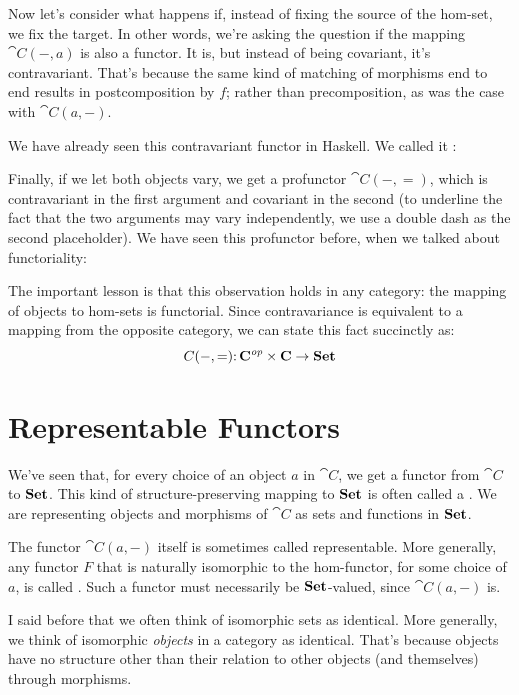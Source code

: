 
Now let's consider what happens if, instead of fixing the source of the
hom-set, we fix the target. In other words, we're asking the question if
the mapping $\cat{C}(-, a)$ is also a functor. It is, but instead of being covariant, it's
contravariant. That's because the same kind of matching of morphisms end
to end results in postcomposition by $f$; rather than
precomposition, as was the case with $\cat{C}(a, -)$.

We have already seen this contravariant functor in Haskell. We called it
:


Finally, if we let both objects vary, we get a profunctor
$\cat{C}(-, =)$, which is contravariant in the first argument and
covariant in the second (to underline the fact that the two arguments
may vary independently, we use a double dash as the second placeholder).
We have seen this profunctor before, when we talked about functoriality:

The important lesson is that this observation holds in any category: the
mapping of objects to hom-sets is functorial. Since contravariance is
equivalent to a mapping from the opposite category, we can state this
fact succinctly as:
\[C(-, =) \mathpunct{:} \mathbf{C}^\mathit{op} \times \mathbf{C} \to \mathbf{Set}\]

\section{Representable Functors}

We've seen that, for every choice of an object $a$ in $\cat{C}$,
we get a functor from $\cat{C}$ to $\mathbf{Set}$. This kind of
structure-preserving mapping to $\mathbf{Set}$ is often called a
. We are representing objects and morphisms of
$\cat{C}$ as sets and functions in $\mathbf{Set}$.

The functor $\cat{C}(a, -)$ itself is sometimes called representable.
More generally, any functor $F$ that is naturally isomorphic to
the hom-functor, for some choice of $a$, is called
. Such a functor must necessarily be
$\mathbf{Set}$-valued, since $\cat{C}(a, -)$ is.

I said before that we often think of isomorphic sets as identical. More
generally, we think of isomorphic \emph{objects} in a category as
identical. That's because objects have no structure other than their
relation to other objects (and themselves) through morphisms.

